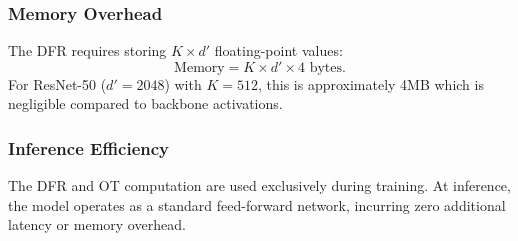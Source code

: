\subsubsection{Memory Overhead}

The DFR requires storing $K \times d'$ floating-point values:
\begin{equation}
    \text{Memory} = K \times d' \times 4 \text{ bytes}.
\end{equation}
For ResNet-50 ($d' = 2048$) with $K = 512$, this is approximately 4MB which is negligible compared to backbone activations.

\subsubsection{Inference Efficiency}

The DFR and OT computation are used exclusively during training. At inference, the model operates as a standard feed-forward network, incurring zero additional latency or memory overhead.